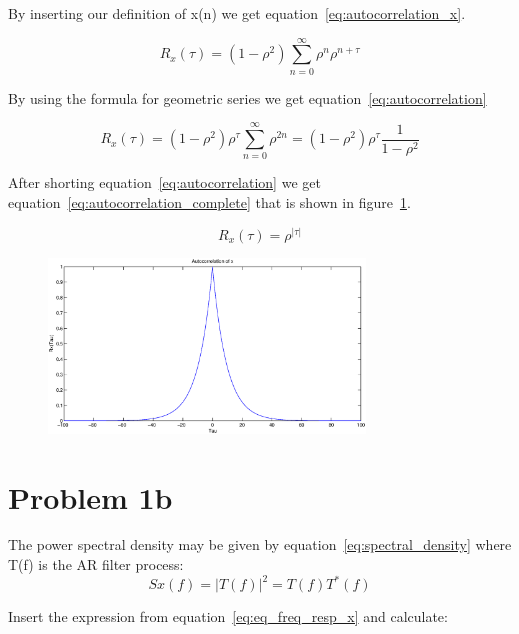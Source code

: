 	By inserting our definition of x(n) we get equation~\ref{eq:autocorrelation_x}.
	
	\begin{equation}
		R_x(\tau)=(1-\rho ^2)\sum_{n=0}^{\infty}\rho ^n\rho^{n+\tau}
		\label{eq:autocorrelation_x}
	\end{equation}
	
	By using the formula for geometric series we get equation~\ref{eq:autocorrelation}
	
	\begin{equation}
		R_x(\tau)=(1-\rho ^2)\rho^{\tau }\sum_{n=0}^{\infty}\rho^{2n}=(1-\rho ^2)\rho^{\tau }\frac{1}{1-\rho ^2}
		\label{eq:autocorrelation}
	\end{equation}
	
	After shorting equation~\ref{eq:autocorrelation} we get equation~\ref{eq:autocorrelation_complete} that is shown in figure~\ref{fig:autocorrelation}.
	
	\begin{equation}
		R_x(\tau)=\rho^{|\tau |}
		\label{eq:autocorrelation_complete}
	\end{equation}

	
	\begin{figure}[H]
	  \centering
	  \includegraphics[width=0.75\textwidth]{img/Oppgave1a}
	  \label{fig:autocorrelation}
	\end{figure}
	
  
  
  \section{Problem 1b}
	The power spectral density may be given by equation~\ref{eq:spectral_density} where T(f) is the AR filter process:
	\begin{equation}[H]
		Sx(f)=|T(f)|^2=T(f)T^*(f)
		\label{eq:spectral_density}
	\end{equation}
	
	Insert the expression from equation~\ref{eq:eq_freq_resp_x} and calculate:
	
